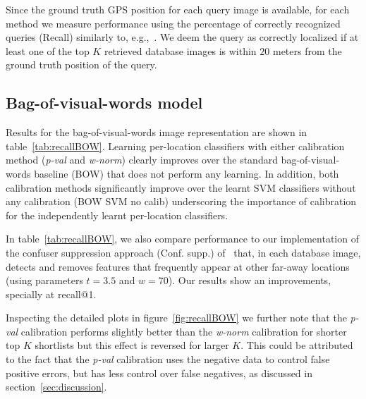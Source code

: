   Since the ground truth GPS position for each query image is available, for each method we measure performance using the percentage of correctly recognized queries (Recall) similarly to, e.g.,~\cite{Chen11,Knopp2010,Sattler-BMVC12}. We deem the query as correctly localized if at least one of the top $K$ retrieved database images is within $20$ meters from the ground truth position of the query. 


  \subsection{Bag-of-visual-words model}
  \label{sec:bow_results}
%
    Results for the bag-of-visual-words image representation are shown in table~\ref{tab:recallBOW}.  
    Learning per-location classifiers with either calibration method (\emph{p-val} and \emph{w-norm}) clearly improves over the standard bag-of-visual-words baseline (BOW) that does not perform any learning. In addition, both calibration methods significantly improve over the learnt SVM classifiers without any calibration (BOW SVM no calib) underscoring the importance of calibration for the independently learnt per-location classifiers.  

    In table~\ref{tab:recallBOW}, we also compare performance to our implementation of the confuser suppression approach (Conf. supp.) of~\cite{Knopp2010} that, in each database image, detects and removes features that frequently appear at other far-away locations (using parameters $t=3.5$ and $w=70$).  
    \textcolor{petr} {Our results show an improvements, specially at recall@1.}


    Inspecting the detailed plots in figure~\ref{fig:recallBOW} we further note that the  \emph{p-val} calibration performs slightly better than the \emph{w-norm} calibration for shorter top $K$ shortlists but this effect is reversed for larger $K$. This could be attributed to the fact that the \emph{p-val} calibration uses the negative data to control false positive errors, but has less control over false negatives, as discussed in section~\ref{sec:discussion}. 

